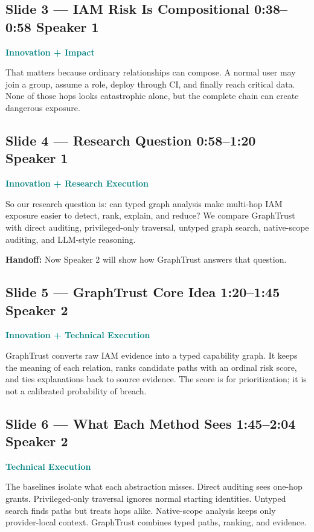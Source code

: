 \documentclass[11pt,a4paper]{article}
\newcommand{\speakerone}{\textbf{Speaker 1}}
\newcommand{\speakertwo}{\textbf{Speaker 2}}
\newcommand{\criterion}[1]{\textcolor{Teal}{\textbf{#1}}}
\newcommand{\timebox}[1]{\textcolor{Muted}{\textbf{#1}}}
\begin{document}
\subsection*{Slide 3 --- IAM Risk Is Compositional \hfill \timebox{0:38--0:58} \quad \speakerone}
\criterion{Innovation + Impact}

That matters because ordinary relationships can compose. A normal user may join a group, assume a role, deploy through CI, and finally reach critical data. None of those hops looks catastrophic alone, but the complete chain can create dangerous exposure.

\subsection*{Slide 4 --- Research Question \hfill \timebox{0:58--1:20} \quad \speakerone}
\criterion{Innovation + Research Execution}

So our research question is: can typed graph analysis make multi-hop IAM exposure easier to detect, rank, explain, and reduce? We compare GraphTrust with direct auditing, privileged-only traversal, untyped graph search, native-scope auditing, and LLM-style reasoning.

\textbf{Handoff:} Now Speaker 2 will show how GraphTrust answers that question.

\subsection*{Slide 5 --- GraphTrust Core Idea \hfill \timebox{1:20--1:45} \quad \speakertwo}
\criterion{Innovation + Technical Execution}

GraphTrust converts raw IAM evidence into a typed capability graph. It keeps the meaning of each relation, ranks candidate paths with an ordinal risk score, and ties explanations back to source evidence. The score is for prioritization; it is not a calibrated probability of breach.

\subsection*{Slide 6 --- What Each Method Sees \hfill \timebox{1:45--2:04} \quad \speakertwo}
\criterion{Technical Execution}

The baselines isolate what each abstraction misses. Direct auditing sees one-hop grants. Privileged-only traversal ignores normal starting identities. Untyped search finds paths but treats hops alike. Native-scope analysis keeps only provider-local context. GraphTrust combines typed paths, ranking, and evidence.
\end{document}
